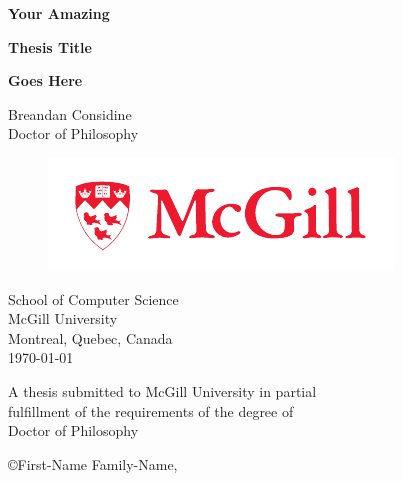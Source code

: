 


\begin{titlepage}
\begin{center}

\vspace*{0.5cm}


{\bfseries\LARGE  Your Amazing}
\vspace{0.15cm}

{\bfseries\LARGE  Thesis Title}
\vspace{0.15cm}

{\bfseries\LARGE  Goes Here}
\vspace{1.8cm}

{\large Breandan Considine}
\\Doctor of Philosophy

\vspace{1cm}
\begin{figure}[ht!]
    \centering
    \includegraphics[width=.6\linewidth]{images/mcgill_sig_red.pdf}
  \end{figure}
School of Computer Science\\
McGill University\\
Montreal, Quebec, Canada\\

\vspace{1.5cm}
\today


\vspace{1.0cm}
\noindent
A thesis submitted to McGill University in partial\\
fulfillment of the requirements of the degree of\\
Doctor of Philosophy

\vspace{1.0cm}
{\small \copyright First-Name Family-Name, \the\year{}}


\end{center}
\end{titlepage}





